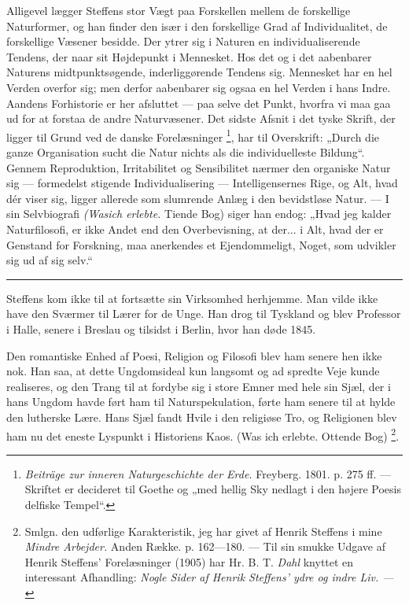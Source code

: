 \documentclass[12pt,a4paper,openany]{book}
\newcommand{\opage}[1]{\marginnote{\footnotesize\textit{[#1]}}}
\begin{document}
Alligevel lægger Steffens stor Vægt paa Forskellen mellem de forskellige
Naturformer, og han finder den især i den forskellige Grad af Individualitet,
de forskellige Væsener besidde. Der ytrer sig i Naturen en individualiserende
Tendens, der naar sit Højdepunkt i Mennesket. Hos det og i det
\setcounter{footnote}{0}%
\opage{46}aabenbarer Naturens midtpunktsøgende, inderliggørende Tendens sig.
Mennesket har en hel Verden overfor sig; men derfor aabenbarer sig ogsaa en hel
Verden i hans Indre. Aandens Forhistorie er her afsluttet --- paa selve det
Punkt, hvorfra vi maa gaa ud for at forstaa de andre Naturvæsener. Det sidste
Afsnit i det tyske Skrift, der ligger til Grund ved de danske Forelæsninger%
\footnote[1]{\textit{Beiträge zur inneren Naturgeschichte der Erde.} Freyberg.
1801. p. 275 ff. --- Skriftet er decideret til Goethe og „med hellig Sky
nedlagt i den højere Poesis delfiske Tempel“.}, har til Overskrift: „Durch die
ganze Organisation sucht die Natur nichts als die individuelleste Bildung“.
Gennem Reproduktion, Irritabilitet og Sensibilitet nærmer den organiske Natur
sig --- formedelst stigende Individualisering --- Intelligensernes Rige, og
Alt, hvad dér viser sig, ligger allerede som slumrende Anlæg i den bevidstløse
Natur. --- I sin Selvbiografi \textit{(Was}\textit{ich erlebte.} Tiende Bog)
siger han endog: „Hvad jeg kalder Naturfilosofi, er ikke Andet end den
Overbevisning, at der... i Alt, hvad der er Genstand for Forskning, maa
anerkendes et Ejendommeligt, Noget, som udvikler sig ud af sig selv.“

\begin{center}\rule{2cm}{0.4pt}\end{center}

Steffens kom ikke til at fortsætte sin Virksomhed herhjemme. Man vilde ikke
have den Sværmer til Lærer for de Unge. Han drog til Tyskland og blev Professor
i Halle, senere i Breslau og tilsidst i Berlin, hvor han døde 1845.

Den romantiske Enhed af Poesi, Religion og Filosofi blev ham senere hen ikke
nok. Han saa, at dette Ungdomsideal kun langsomt og ad spredte Veje kunde
realiseres, og den Trang til at fordybe sig i store Emner med hele sin Sjæl,
der i hans Ungdom havde ført ham til Naturspekulation, førte ham senere til at
hylde den lutherske Lære. Hans Sjæl fandt Hvile i den religiøse Tro, og
Religionen blev ham nu det eneste Lyspunkt i Historiens Kaos. (Was ich erlebte.
Ottende Bog)%
\footnote[2]{Smlgn. den udførlige Karakteristik, jeg har givet af Henrik
Steffens i mine \textit{Mindre Arbejder.} Anden Række. p. 162---180. --- Til
sin smukke Udgave af Henrik Steffens' Forelæsninger (1905) har Hr. B. T.
\emph{Dahl} knyttet en interessant Afhandling: \textit{Nogle Sider af Henrik
Steffens' ydre og indre Liv. ---}}.
\end{document}
